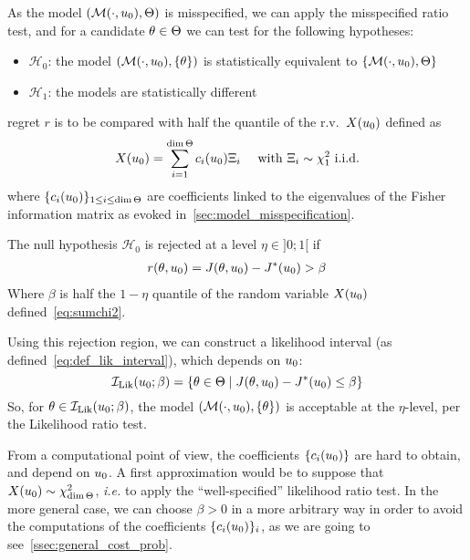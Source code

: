 \documentclass[../../Main_ManuscritThese.tex]{subfiles}
\begin{document}
  
As the model $(\mathcal{M}(\cdot, u_0), \Theta)$ is misspecified, we can apply the misspecified ratio test, and for a candidate $\theta\in \Theta$ we can test for the following hypotheses:
 \begin{itemize}
 \item $\mathcal{H}_0$: the model $\left(\mathcal{M}(\cdot, u_0), \{\theta\}\right)$ is statistically equivalent to $\left\{\mathcal{M}(\cdot, u_0), \Theta\right\}$
 \item $\mathcal{H}_1$: the models are statistically different
 \end{itemize}
  regret $r$ is to be compared with half the quantile of the r.v.\ $X(u_0)$ defined as
  \begin{equation}
    \label{eq:sumchi2}
X(u_0)=\sum_{i=1}^{\dim \Theta} c_i(u_0) \Xi_i \quad \text{ with } \Xi_i \sim \chi^2_1 \text{ i.i.d.}
\end{equation}
 where $\{c_i(u_0)\}_{1\leq i \leq \dim \Theta}$ are coefficients linked to the eigenvalues of the Fisher information matrix as evoked in~\cref{sec:model_misspecification}.
 
The null hypothesis $\mathcal{H}_0$ is rejected at a level $\eta \in ]0;1[$ if
  \begin{align}
  r(\theta, u_0)=J(\theta, u_0) - J^*(u_0) > \beta 
  \end{align}
  Where $\beta$ is half the $1-\eta$ quantile of the random variable $X(u_0)$ defined~\eqref{eq:sumchi2}.
  
 Using this rejection region, we can construct a likelihood interval (as defined~\cref{eq:def_lik_interval}), which depends on $u_0$:
  \begin{equation}
    \label{eq:lik_interval_add}
    \mathcal{I}_{\mathrm{Lik}}(u_0; \beta) = \left\{\theta\in \Theta \mid  J(\theta, u_0) - J^*(u_0) \leq \beta\right\}
  \end{equation}
  So, for $\theta \in \mathcal{I}_{\mathrm{Lik}}(u_0;\beta)$, the model $(\mathcal{M}(\cdot, u_0),\{\theta\})$ is acceptable at the $\eta$-level, per the Likelihood ratio test.

  
  From a computational point of view, the coefficients $\{c_i(u_0)\}$ are hard to obtain, and depend on $u_0$. A first approximation would be to suppose that $X(u_0) \sim \chi^2_{\dim \Theta}$, \emph{i.e.} to apply the ``well-specified'' likelihood ratio test. In the more general case, we can choose $\beta>0$ in a more arbitrary way in order to avoid the computations of the coefficients $\{c_i(u_0)\}_i$, as we are going to see~\cref{ssec:general_cost_prob}.
  
\end{document}
